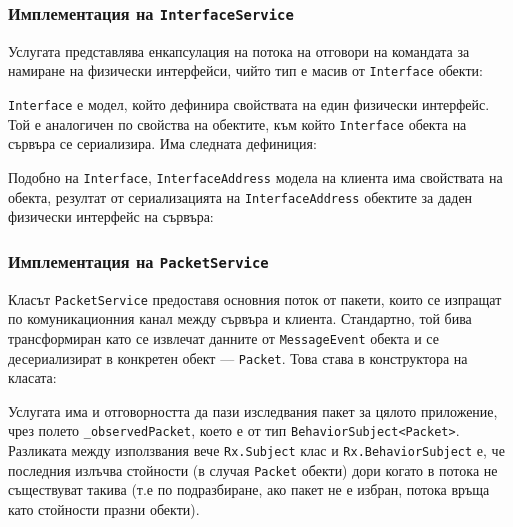 \documentclass[12pt,a4paper,oneside]{book}
\begin{document}
\subsubsection{Имплементация на \texttt{InterfaceService}}

Услугата представлява енкапсулация на потока на отговори на командата за
намиране на физически интерфейси, чийто тип е масив от \texttt{Interface}
обекти:



\texttt{Interface} е модел, който дефинира свойствата на един физически
интерфейс. Той е аналогичен по свойства на обектите, към който
\texttt{Interface} обекта на сървъра се сериализира. Има следната дефиниция:



Подобно на \texttt{Interface}, \texttt{InterfaceAddress} модела на клиента
има свойствата на обекта, резултат от сериализацията на
\texttt{InterfaceAddress} обектите за даден физически интерфейс на сървъра:



\subsubsection{Имплементация на \texttt{PacketService}}

Класът \texttt{PacketService} предоставя основния поток от пакети, които се
изпращат по комуникационния канал между сървъра и клиента. Стандартно, той бива
трансформиран като се извлечат данните от \texttt{MessageEvent} обекта и се десериализират
в конкретен обект --- \texttt{Packet}. Това става в конструктора на класата:



Услугата има и отговорността да пази изследвания пакет за цялото приложение,
чрез полето
\texttt{\_observedPacket}, което е от тип \texttt{BehaviorSubject<Packet>}.
Разликата между използвания вече \texttt{Rx.Subject} клас и
\texttt{Rx.BehaviorSubject} е, че последния излъчва стойности
(в случая \texttt{Packet} обекти) дори
когато в потока не съществуват такива (т.е по подразбиране, ако пакет не е
избран,
потока връща като стойности празни обекти).
\end{document}
